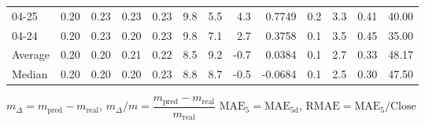\begin{threeparttable}
{\begin{tabular}{lrrrrrrrrrrrr}
  04-25 &          0.20 &          0.23 &          0.23 &        0.23 &                 9.8 &                 5.5 &        4.3 &       0.7749 &                 0.2 &              3.3 &            0.41 &                  40.00 \\
  04-24 &          0.20 &          0.23 &          0.20 &        0.23 &                 9.8 &                 7.1 &        2.7 &       0.3758 &                 0.1 &              3.5 &            0.45 &                  35.00 \\
Average &          0.20 &          0.20 &          0.21 &        0.22 &                 8.5 &                 9.2 &       -0.7 &       0.0384 &                 0.1 &              2.7 &            0.33 &                  48.17 \\
 Median &          0.20 &          0.20 &          0.20 &        0.23 &                 8.8 &                 8.7 &       -0.5 &      -0.0684 &                 0.1 &              2.5 &            0.30 &                  47.50 \\
\bottomrule
\end{tabular}
}
\begin{tablenotes}\footnotesize
\item $m_\Delta=m_{\text{pred}}-m_{\text{real}}$,
$m_\Delta/m=\dfrac{m_{\text{pred}}-m_{\text{real}}}{m_{\text{real}}}$
$\mathrm{MAE}_5=\mathrm{MAE}_{5\text{d}}$,
$\mathrm{RMAE}=\mathrm{MAE}_5/\text{Close}$
\end{tablenotes}
\end{threeparttable}
\endgroup


